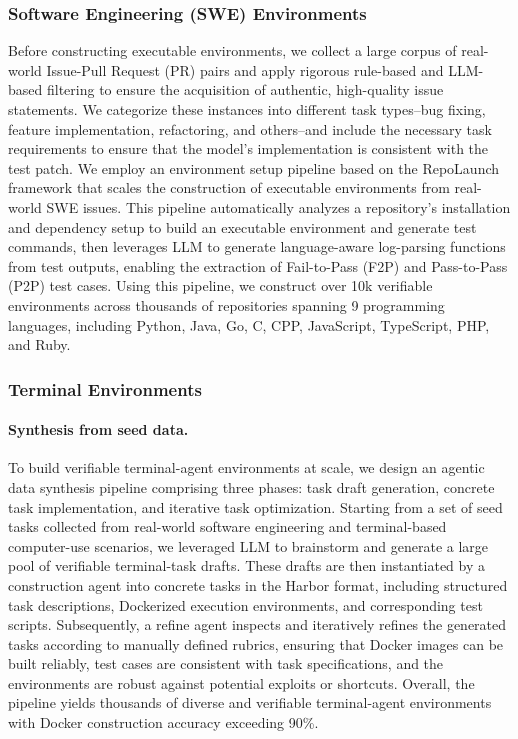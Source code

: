 \subsubsection{Software Engineering (SWE) Environments} 
Before constructing executable environments, we collect a large corpus of real-world Issue-Pull Request (PR) pairs and apply rigorous rule-based and LLM-based filtering to ensure the acquisition of authentic, high-quality issue statements. We categorize these instances into different task types--bug fixing, feature implementation, refactoring, and others--and include the necessary task requirements to ensure that the model's implementation is consistent with the test patch. We employ an environment setup pipeline based on the RepoLaunch~\citep{zhang2025swebenchgoeslive} framework that scales the construction of executable environments from real-world SWE issues. This pipeline automatically analyzes a repository’s installation and dependency setup to build an executable environment and generate test commands, then leverages LLM to generate language-aware log-parsing functions from test outputs, enabling the extraction of  Fail-to-Pass (F2P) and Pass-to-Pass (P2P) test cases. Using this pipeline, we construct over 10k verifiable environments across thousands of repositories spanning 9 programming languages, including Python, Java, Go, C, CPP, JavaScript, TypeScript, PHP, and Ruby. 

\subsubsection{Terminal Environments} 

\paragraph{Synthesis from seed data.} To build verifiable terminal-agent environments at scale, we design an agentic data synthesis pipeline comprising three phases: task draft generation, concrete task implementation, and iterative task optimization. Starting from a set of seed tasks collected from real-world software engineering and terminal-based computer-use scenarios, we leveraged LLM to brainstorm and generate a large pool of verifiable terminal-task drafts. These drafts are then instantiated by a construction agent into concrete tasks in the Harbor \cite{harborframeworkteam2026harborframework} format, including structured task descriptions, Dockerized execution environments, and corresponding test scripts. Subsequently, a refine agent inspects and iteratively refines the generated tasks according to manually defined rubrics, ensuring that Docker images can be built reliably, test cases are consistent with task specifications, and the environments are robust against potential exploits or shortcuts. Overall, the pipeline yields thousands of diverse and verifiable terminal-agent environments with Docker construction accuracy exceeding 90\%. 


